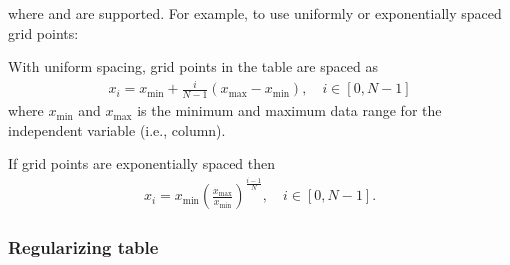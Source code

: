 \documentclass[letterpaper,10pt,english]{sphinxmanual}
\begin{document}
\begin{sphinxVerbatim}[commandchars=\\\{\},formatcom=\scriptsize]
   
\end{sphinxVerbatim}

where  and  are supported.
For example, to use uniformly or exponentially spaced grid points:

\begin{sphinxVerbatim}[commandchars=\\\{\},formatcom=\scriptsize]
 

     
 
\end{sphinxVerbatim}


With uniform spacing, grid points in the table are spaced as
\begin{equation*}
\begin{split}x_i = x_{\textrm{min}} + \frac{i}{N-1}\left(x_{\textrm{max}} - x_{\textrm{min}}\right),\quad i\in[0,N-1]\end{split}
\end{equation*}
where \(x_{\textrm{min}}\) and \(x_{\textrm{max}}\) is the minimum and maximum data range for the independent variable (i.e., column).


If grid points are exponentially spaced then
\begin{equation*}
\begin{split}x_i = x_{\textrm{min}}\left(\frac{x_{\textrm{max}}}{x_{\textrm{min}}}\right)^{\frac{i-1}{N}}, \quad i\in[0,N-1].\end{split}
\end{equation*}

\subsubsection{Regularizing table}
\label{\detokenize{Utilities/LookupTable:regularizing-table}}
\begin{sphinxVerbatim}[commandchars=\\\{\},formatcom=\scriptsize]
   
\end{sphinxVerbatim}
\end{document}
